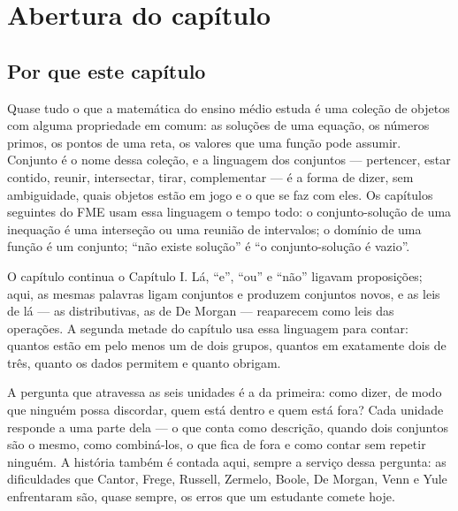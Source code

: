 \section*{Abertura do capítulo}

\subsection*{Por que este capítulo}
Quase tudo o que a matemática do ensino médio estuda é uma coleção de objetos com alguma propriedade em comum: as soluções de uma equação, os números primos, os pontos de uma reta, os valores que uma função pode assumir. Conjunto é o nome dessa coleção, e a linguagem dos conjuntos — pertencer, estar contido, reunir, intersectar, tirar, complementar — é a forma de dizer, sem ambiguidade, quais objetos estão em jogo e o que se faz com eles. Os capítulos seguintes do FME usam essa linguagem o tempo todo: o conjunto-solução de uma inequação é uma interseção ou uma reunião de intervalos; o domínio de uma função é um conjunto; \enquote{não existe solução} é \enquote{o conjunto-solução é vazio}.

O capítulo continua o Capítulo I. Lá, \enquote{e}, \enquote{ou} e \enquote{não} ligavam proposições; aqui, as mesmas palavras ligam conjuntos e produzem conjuntos novos, e as leis de lá — as distributivas, as de De Morgan — reaparecem como leis das operações. A segunda metade do capítulo usa essa linguagem para contar: quantos estão em pelo menos um de dois grupos, quantos em exatamente dois de três, quanto os dados permitem e quanto obrigam.

A pergunta que atravessa as seis unidades é a da primeira: como dizer, de modo que ninguém possa discordar, quem está dentro e quem está fora? Cada unidade responde a uma parte dela — o que conta como descrição, quando dois conjuntos são o mesmo, como combiná-los, o que fica de fora e como contar sem repetir ninguém. A história também é contada aqui, sempre a serviço dessa pergunta: as dificuldades que Cantor, Frege, Russell, Zermelo, Boole, De Morgan, Venn e Yule enfrentaram são, quase sempre, os erros que um estudante comete hoje.

